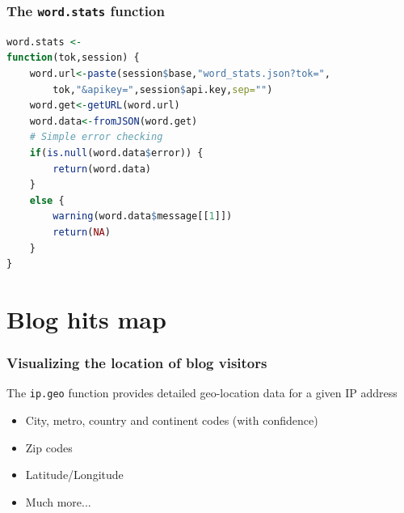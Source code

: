\documentclass[xcolor=dvipsnames, 9pt]{beamer}
\begin{document}
\begin{frame}[fragile]
    \frametitle{The \texttt{word.stats} function}
    \begin{lstlisting}[language=R]
word.stats <-
function(tok,session) {
    word.url<-paste(session$base,"word_stats.json?tok=",
        tok,"&apikey=",session$api.key,sep="")
    word.get<-getURL(word.url)
    word.data<-fromJSON(word.get)
    # Simple error checking
    if(is.null(word.data$error)) {
        return(word.data)
    }
    else {
        warning(word.data$message[[1]])
        return(NA)
    }
}    
    \end{lstlisting}
\end{frame}



\section{Blog hits map} %
\label{sec:blog_hits_map}

\begin{frame}[fragile]
    \frametitle{Visualizing the location of blog visitors}
    The \texttt{ip.geo} function provides detailed geo-location data for a given IP address
    \begin{itemize}
        \item City, metro, country and continent codes (with confidence)
        \item Zip codes
        \item Latitude/Longitude
        \item Much more...
    \end{itemize}
\end{frame}
\end{document}
